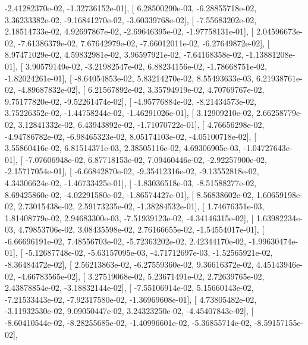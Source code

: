 \documentclass{article}
\begin{document}
         -2.41282370e-02,  -1.32736152e-01],
       [  6.28500290e-03,  -6.28855718e-02,   3.36233382e-02,
         -9.16841270e-02,  -3.60339768e-02],
       [ -7.55683202e-02,   2.18514733e-02,   4.92697867e-02,
         -2.69646395e-02,  -1.97758131e-01],
       [  2.04596673e-02,  -7.61386379e-02,   7.67642979e-02,
         -7.66012011e-02,  -6.27649872e-02],
       [  8.97471029e-02,   4.59832981e-02,   3.96597921e-02,
         -7.64168358e-02,  -1.13881208e-01],
       [  3.90579149e-02,  -3.21982547e-02,   6.88234156e-02,
         -1.78668751e-02,  -1.82024261e-01],
       [ -8.64054853e-02,   5.83214270e-02,   8.55493633e-03,
          6.21938761e-02,  -4.89687832e-02],
       [  6.21567892e-02,   3.35794919e-02,   4.70769767e-02,
          9.75177820e-02,  -9.52261474e-02],
       [ -4.95776884e-02,  -8.21434573e-02,   3.75226352e-02,
         -1.44758244e-02,  -1.46291026e-01],
       [  3.12909210e-02,   2.66258779e-02,   3.12841332e-02,
          6.43943892e-02,  -1.71070722e-01],
       [  4.76656298e-02,  -4.94786782e-02,  -6.98465323e-02,
          8.05174103e-02,  -4.05100718e-02],
       [  3.55860416e-02,   6.81514371e-03,   2.38505116e-02,
          4.69306905e-03,  -1.04727643e-01],
       [ -7.07606948e-02,   6.87718153e-02,   7.09460446e-02,
         -2.92257900e-02,  -2.15717054e-01],
       [ -6.66842870e-02,  -9.35412316e-02,  -9.13552818e-02,
          4.34306624e-02,  -1.46733425e-01],
       [ -1.83036518e-03,  -8.51588277e-02,   8.69425860e-02,
         -4.02291580e-02,  -1.86574427e-01],
       [  8.56838602e-02,   1.60659198e-02,   2.73015438e-02,
          2.59173235e-02,  -1.38284532e-01],
       [  1.74676351e-03,   1.81408779e-02,   2.94683300e-03,
         -7.51939123e-02,  -4.34146315e-02],
       [  1.63982234e-03,   4.79853706e-02,   3.08435598e-02,
          2.76166655e-02,  -1.54554017e-01],
       [ -6.66696191e-02,   7.48556703e-02,  -5.72363202e-02,
          2.42344170e-02,  -1.99630474e-01],
       [ -5.12687748e-02,  -5.63157095e-03,  -4.71712697e-03,
         -1.52565921e-02,  -8.36484472e-02],
       [  2.56213863e-02,  -6.27559360e-02,   9.36616372e-02,
          4.45143946e-02,  -4.66783565e-02],
       [  3.27519068e-02,   5.23671491e-02,   2.72639765e-02,
          2.43878854e-02,  -3.18832144e-02],
       [ -7.55106914e-02,   5.15660143e-02,  -7.21533443e-02,
         -7.92317580e-02,  -1.36969608e-01],
       [  4.73805482e-02,  -3.11932530e-02,   9.09050447e-02,
          3.24323250e-02,  -4.45407843e-02],
       [ -8.60410544e-02,  -8.28255685e-02,  -1.40996601e-02,
         -5.36855714e-02,  -8.59157155e-02],
\end{document}
